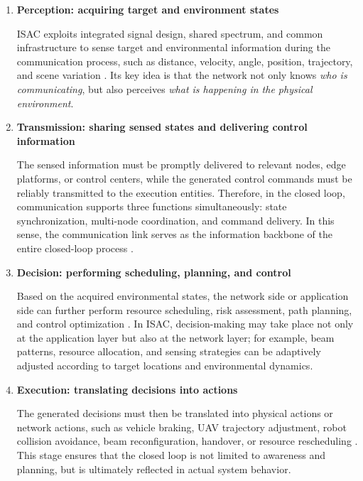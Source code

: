 \begin{enumerate}[label=(\arabic*)]
\item \textbf{Perception: acquiring target and environment states}

ISAC exploits integrated signal design, shared spectrum, and common infrastructure to sense target and environmental information during the communication process, such as distance, velocity, angle, position, trajectory, and scene variation \cite{Sturm2011WaveformDesign, Hassanien2016signaling, Liu2022ISAC}.  
Its key idea is that the network not only knows \emph{who is communicating}, but also perceives \emph{what is happening in the physical environment}.

\item \textbf{Transmission: sharing sensed states and delivering control information}

The sensed information must be promptly delivered to relevant nodes, edge platforms, or control centers, while the generated control commands must be reliably transmitted to the execution entities. Therefore, in the closed loop, communication supports three functions simultaneously: state synchronization, multi-node coordination, and command delivery. In this sense, the communication link serves as the information backbone of the entire closed-loop process \cite{ITU2030, IMT2030Framework}.

\item \textbf{Decision: performing scheduling, planning, and control}

Based on the acquired environmental states, the network side or application side can further perform resource scheduling, risk assessment, path planning, and control optimization \cite{Letaief2019Roadmap, Saad2020Vision6G}. In ISAC, decision-making may take place not only at the application layer but also at the network layer; for example, beam patterns, resource allocation, and sensing strategies can be adaptively adjusted according to target locations and environmental dynamics.

\item \textbf{Execution: translating decisions into actions}

The generated decisions must then be translated into physical actions or network actions, such as vehicle braking, UAV trajectory adjustment, robot collision avoidance, beam reconfiguration, handover, or resource rescheduling \cite{Saad2020Vision6G}. This stage ensures that the closed loop is not limited to awareness and planning, but is ultimately reflected in actual system behavior.


\end{enumerate}
